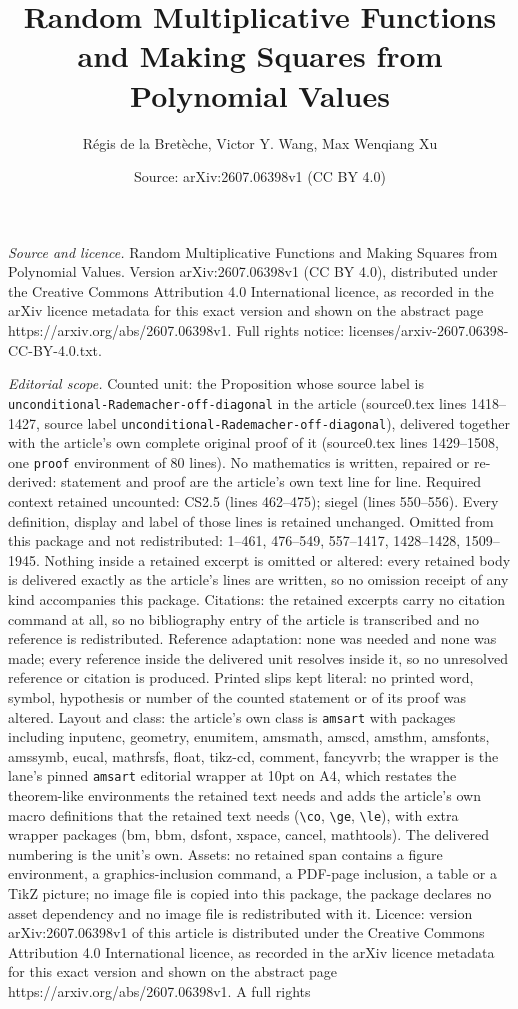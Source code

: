 \documentclass[10pt,a4paper]{amsart}
\title[Random Multiplicative Functions and Making Squares from Poly]{Random Multiplicative Functions and Making Squares from Polynomial Values}
\author{R\'egis de la Bret\`eche, Victor Y. Wang, Max Wenqiang Xu}
\date{Source: arXiv:2607.06398v1 (CC BY 4.0)}
\begin{document}
\maketitle

\noindent\emph{Source and licence.} Random Multiplicative Functions and Making Squares from Polynomial Values. Version arXiv:2607.06398v1 (CC BY 4.0), distributed under the Creative Commons Attribution 4.0 International licence, as recorded in the arXiv licence metadata for this exact version and shown on the abstract page https://arxiv.org/abs/2607.06398v1. Full rights notice: licenses/arxiv-2607.06398-CC-BY-4.0.txt.\par\smallskip

\noindent\textit{Editorial scope.} Counted unit: the Proposition whose source label is \texttt{unconditional-Rademacher-off-diagonal} in the article (source0.tex lines 1418--1427, source label \texttt{unconditional-Rademacher-off-diagonal}), delivered together with the article's own complete original proof of it (source0.tex lines 1429--1508, one \texttt{proof} environment of 80 lines). No mathematics is written, repaired or re-derived: statement and proof are the article's own text line for line. Required context retained uncounted: CS2.5 (lines 462--475); siegel (lines 550--556). Every definition, display and label of those lines is retained unchanged. Omitted from this package and not redistributed: 1--461, 476--549, 557--1417, 1428--1428, 1509--1945. Nothing inside a retained excerpt is omitted or altered: every retained body is delivered exactly as the article's lines are written, so no omission receipt of any kind accompanies this package. Citations: the retained excerpts carry no citation command at all, so no bibliography entry of the article is transcribed and no reference is redistributed. Reference adaptation: none was needed and none was made; every reference inside the delivered unit resolves inside it, so no unresolved reference or citation is produced. Printed slips kept literal: no printed word, symbol, hypothesis or number of the counted statement or of its proof was altered. Layout and class: the article's own class is \texttt{amsart} with packages including inputenc, geometry, enumitem, amsmath, amscd, amsthm, amsfonts, amssymb, eucal, mathrsfs, float, tikz-cd, comment, fancyvrb; the wrapper is the lane's pinned \texttt{amsart} editorial wrapper at 10pt on A4, which restates the theorem-like environments the retained text needs and adds the article's own macro definitions that the retained text needs (\texttt{\textbackslash co}, \texttt{\textbackslash ge}, \texttt{\textbackslash le}), with extra wrapper packages (bm, bbm, dsfont, xspace, cancel, mathtools). The delivered numbering is the unit's own. Assets: no retained span contains a figure environment, a graphics-inclusion command, a PDF-page inclusion, a table or a TikZ picture; no image file is copied into this package, the package declares no asset dependency and no image file is redistributed with it. Licence: version arXiv:2607.06398v1 of this article is distributed under the Creative Commons Attribution 4.0 International licence, as recorded in the arXiv licence metadata for this exact version and shown on the abstract page https://arxiv.org/abs/2607.06398v1. A full rights 
\end{document}
